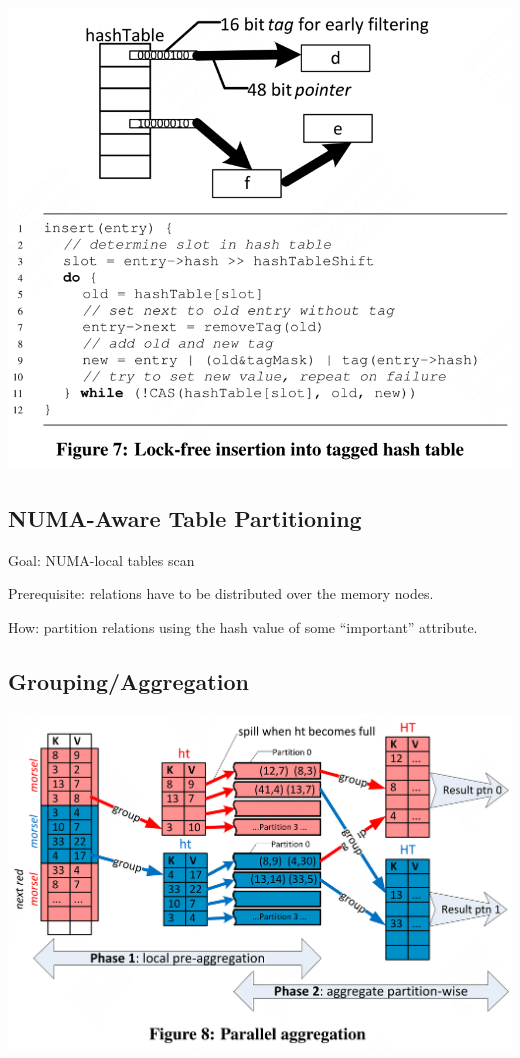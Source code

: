 \documentclass[11pt]{article}
\begin{document}
\begin{center}
\includegraphics[width=.8\textwidth]{../../images/papers/156.png}
\label{f7}
\end{center}
\subsection{NUMA-Aware Table Partitioning}
\label{sec:org2863e58}
Goal: NUMA-local tables scan

Prerequisite: relations have to be distributed over the memory nodes.

How: partition relations using the hash value of some “important” attribute.
\subsection{Grouping/Aggregation}
\label{sec:org53a1864}
\begin{center}
\includegraphics[width=.7\textwidth]{../../images/papers/157.png}
\label{f8}
\end{center}
\end{document}
